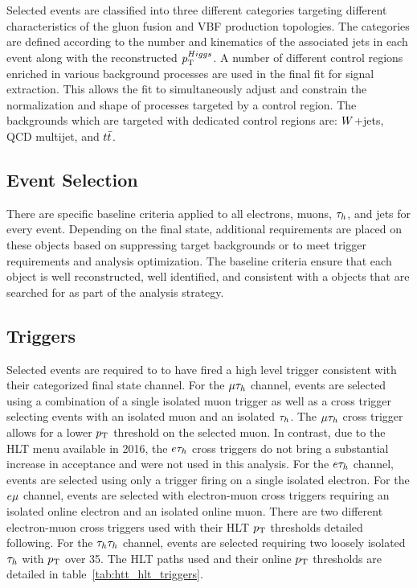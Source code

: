 Selected events are classified into three different categories targeting different characteristics
of the gluon fusion and VBF production topologies. The categories are defined according to the
number and kinematics of the associated jets in each event along with the reconstructed $p_\mathrm{T}^{Higgs}$.
A number of different control regions enriched in various background processes 
are used in the final fit for signal extraction. This allows
the fit to simultaneously adjust and constrain the normalization and shape of
processes targeted by a control region. The backgrounds which are
targeted with dedicated control regions are: $W$+jets, QCD multijet, and $t\bar{t}$.



\subsection{Event Selection}

There are specific baseline criteria applied to all electrons, muons, $\tau_{h}$, and jets for every
event. Depending on the final state, additional requirements are placed on these objects based
on suppressing target backgrounds or to meet trigger requirements and analysis optimization. The baseline criteria ensure that each object is well reconstructed, well identified, and
consistent with a objects that are searched for as part of the analysis strategy.

\subsection{Triggers}
\label{sec:htt_triggers}
Selected events are required to to have fired a high level trigger consistent with their categorized final
state channel. For the $\mu\tau_{h}$ channel, events are selected using a combination
of a single isolated muon trigger as well as a cross trigger selecting events with an isolated muon and
an isolated $\tau_{h}$. The $\mu\tau_{h}$ cross trigger allows for a lower $p_\mathrm{T}$ threshold
on the selected muon. In contrast, due to the HLT menu available in 2016, the $e\tau_{h}$ cross triggers
do not bring a substantial increase in acceptance and were not used in this analysis.
For the $e\tau_{h}$ channel, events are selected using only a trigger firing on a 
single isolated electron. For the $e\mu$ channel, events are selected with electron-muon cross
triggers requiring an isolated online electron and an isolated online muon. There are two 
different electron-muon cross triggers used with their HLT $p_\mathrm{T}$ thresholds detailed following.
For the $\tau_{h}\tau_{h}$ channel, events are selected requiring two loosely isolated $\tau_{h}$ 
with $p_\mathrm{T}$ over 35\GeV.
The HLT paths used and their online $p_\mathrm{T}$ thresholds are detailed in table~\ref{tab:htt_hlt_triggers}.

